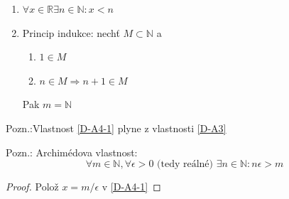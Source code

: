 \begin{definitionAi}
	\begin{enumerate}[I]
		\item\label{D-A4-1} $\forall x\in\mathbb{R}\exists n\in\mathbb{N}: x<n$
		\item Princip indukce: nechť $M\subset\mathbb{N}$ a
			\begin{enumerate}
				\item $1\in M$
				\item $n\in M \Rightarrow n+1\in M$
			\end{enumerate}
			Pak $m=\mathbb{N}$
	\end{enumerate}
\end{definitionAi}

Pozn.:Vlastnost \ref{D-A4-1} plyne z vlastnosti \ref{D-A3}

Pozn.: Archimédova vlastnost:
\begin{equation}
	\forall m\in\mathbb{N}, \forall \epsilon>0 \text{ (tedy reálné) }\exists n\in\mathbb{N}:n\epsilon>m
\end{equation}
\begin{proof}
	Polož $x=m/\epsilon$ v \ref{D-A4-1}
\end{proof}

